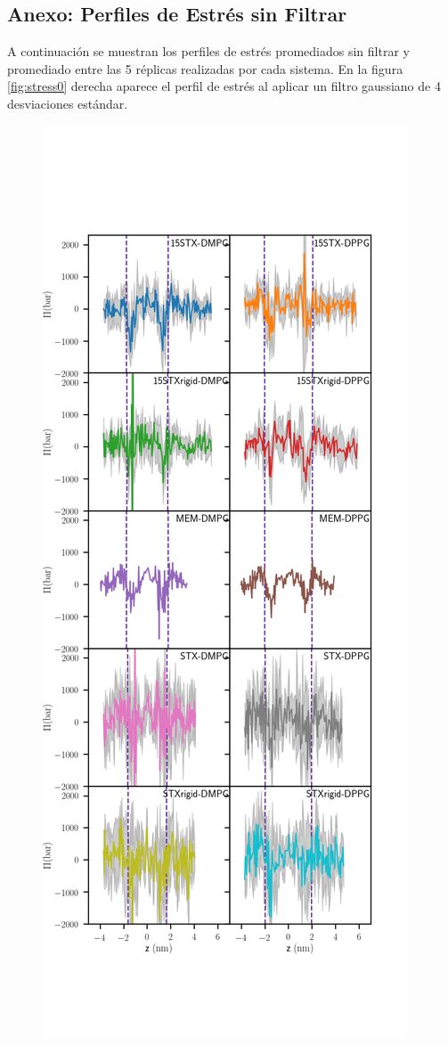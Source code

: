 \begin{appendix}
\chapter{Anexo: Perfiles de Estr\'{e}s sin Filtrar}\label{AnexoB}
A continuaci\'{o}n se muestran los perfiles de estr\'{e}s promediados sin filtrar y promediado entre las 5 r\'{e}plicas realizadas por cada sistema.
En la figura \ref{fig:stress0} derecha aparece el perfil de estr\'{e}s al aplicar un filtro gaussiano de 4 desviaciones est\'{a}ndar.\\
\begin{figure}[h]
\begin{center}
    \includegraphics[scale=0.22,trim={0 6cm 0 8cm},clip]{Plots/stress_profile.png}

\end{center}
\end{figure}
\end{appendix}
